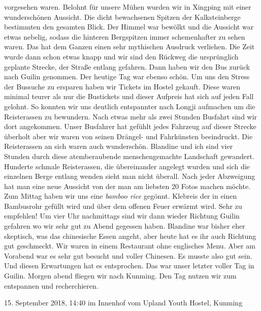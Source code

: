 \documentclass[11pt]{book}
\begin{document}
vorgesehen waren. Belohnt für unsere Mühen wurden wir in Xingping mit einer wunderschönen Aussicht. Die dicht 
bewachsenen Spitzen der Kalksteinberge bestimmten den gesamten Blick. Der Himmel war bewölkt und die Aussicht war 
etwas nebelig, sodass die hinteren Bergspitzen immer schemenhafter zu sehen waren. Das hat dem Ganzen einen sehr 
mythischen Ausdruck verliehen. Die Zeit wurde dann schon etwas knapp und wir sind den Rückweg die ursprünglich 
geplante Strecke, der Straße entlang gefahren. Dann haben wir den Bus zurück nach Guilin genommen.
Der heutige Tag war ebenso schön. Um uns den Stress der Bussuche zu ersparen haben wir Tickets im Hostel gekauft. 
Diese waren minimal teurer als nur die Bustickets und dieser Aufpreis hat sich auf jeden Fall gelohnt. So konnten 
wir uns deutlich entspannter nach Longji aufmachen um die Reisterassen zu bewundern. Nach etwas mehr als zwei 
Stunden Busfahrt sind wir dort angekommen. Unser Busfahrer hat gefühlt jedes Fahrzeug auf dieser Strecke überholt 
aber wir waren von seinen Drängel- und Fahrkünsten beeindruckt. Die Reisterassen an sich waren auch wunderschön. 
Blandine und ich sind vier Stunden durch diese atemberaubende menschengemachte Landschaft gewandert. Hunderte 
schmale Reisterassen, die übereinander angelegt wurden und sich die einzelnen Berge entlang wenden sieht man 
nicht überall. Nach jeder Abzweigung hat man eine neue Aussicht von der man am liebsten 20 Fotos machen möchte. 
Zum Mittag haben wir uns eine \emph{bamboo rice} gegönnt. Klebreis der in einen Bambusrohr gefüllt wird und über 
dem offenen Feuer erwärmt wird. Sehr zu empfehlen! Um vier Uhr nachmittags sind wir dann wieder Richtung Guilin 
gefahren wo wir sehr gut zu Abend gegessen haben. Blandine war bisher eher skeptisch, was das chinesische Essen 
angeht, aber heute hat es ihr auch Richtung gut geschmeckt. Wir waren in einem Restaurant ohne englisches Menu. 
Aber am Vorabend war es sehr gut besucht und voller Chinesen. Es musste also gut sein. Und diesen Erwartungen 
hat es entsprochen. Das war unser letzter voller Tag in Guilin. Morgen abend fliegen wir nach Kunming. Den Tag 
nutzen wir zum entspannen und recherchieren.

15. September 2018, 14:40 im Innenhof vom Upland Youth Hostel, Kunming
\end{document}

